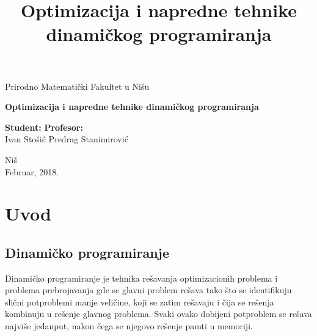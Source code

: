 \documentclass[a4paper,12pt]{article}
\title{\Huge \bf Optimizacija i napredne tehnike dinami\v ckog programiranja}
\numberwithin{equation}{subsection}
\begin{document}
\renewcommand{\abstractname}{Apstrakt}
\renewcommand{\refname}{Reference}
\renewcommand{\contentsname}{Sadr\v zaj}

\begin{titlepage}
\begin{center}
{\large Prirodno Matemati\v cki Fakultet u Ni\v su}
\end{center}
\vspace{5cm}
\begin{center}
{\Huge \textbf{Optimizacija i napredne tehnike dinami\v ckog programiranja}}
\end{center}
\vspace{7cm}
\large \textbf{Student:} \hspace{8.9 cm} \textbf{Profesor:} \\
\large Ivan Sto\v si\' c \hspace{6.6 cm} Predrag Stanimirovi\' c
\vspace{2.5cm}
\begin{center}{Ni\v s\\
Februar, 2018.}\end{center}
\end{titlepage}

\thispagestyle{headings}

\tableofcontents

\newpage

\pagestyle{headings}

\section{Uvod}

\subsection{Dinami\v cko programiranje}

Dinami\v cko programiranje je tehnika re\v savanja optimizacionih problema i problema prebrojavanja gde se glavni problem re\v sava tako \v sto se identifikuju sli\v cni potproblemi manje veli\v cine, koji se zatim re\v savaju i \v cija se re\v senja kombinuju u re\v senje glavnog problema. Svaki ovako dobijeni potproblem se re\v sava najvi\v se jedanput, nakon \v cega se njegovo re\v senje pamti u memoriji.
\\
\end{document}
